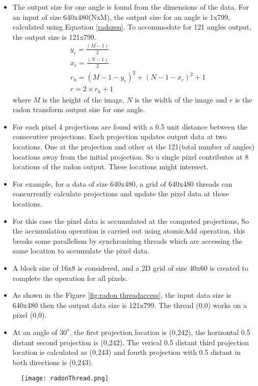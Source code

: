 \begin{itemize}
\begin{itemize}
	\item The output size for one angle is found from the dimensions of the data. For an input of size 640x480(NxM), the output size for an angle is 1x799, calculated using Equation \ref{radszeq}. To accommodate for 121 angles output, the output size is 121x799.
	\begin{align}\label{radszeq}
	&y_c =  	\frac{(M-1)}{2}\\ &
	x_c = \frac{(N-1)}{2} \\  &
	r_h = (M-1-y_c)^2 + (N-1-x_c)^2 + 1\\&
	r = 2 \times r_h + 1
	\end{align}
	where $M$ is the height of the image, $N$ is the width of the image and $r$ is the radon transform output size for one angle.  
	\item For each pixel 4 projections are found with a 0.5 unit distance between the consecutive projections. Each projection updates output data at two locations. One at the projection and other at the 121(total number of angles) locations away from the initial projection. So a single pixel contributes at 8 locations of the radon output. These locations might intersect.
	\item For example, for a data of size 640x480, a grid of 640x480 threads can concurrently calculate projections and update the pixel data at those locations.
	\item For this case the pixel data is accumulated at the computed projections, So the accumulation operation is carried out using atomicAdd operation, this breaks some parallelism by synchronizing threads which are accessing the same location to accumulate the pixel data.
	\item A block size of 16x8 is considered, and a 2D grid of size 40x60 is created to complete the operation for all pixels.
	\item As shown in the Figure \ref{fig:radon threadaccess}, the input data size is 640x480 then the output data size is 121x799. The  thread (0,0) works on a pixel (0,0). 
	\item At an angle of $30^o$, the first projection location is (0,242), the horizontal 0.5 distant second projection is (0,242). The verical 0.5 distant third projection location is calculated as (0,243) and fourth projection with 0.5 distant in both directions is (0,243).\\
\end{itemize}
\begin{figure}[h!]
	\centering
	\texttt{[image: radonThread.png]}

\end{figure}
\end{itemize}
